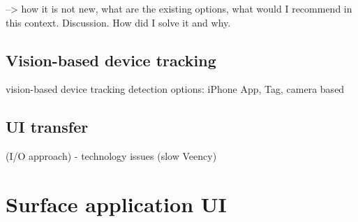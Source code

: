 --> how it is not new, what are the existing options, what would I recommend in this context. Discussion. How did I solve it and why.

\subsection{Vision-based device tracking}
vision-based device tracking
detection options: iPhone App, Tag, camera based 

\subsection{UI transfer}
 (I/O approach)
- technology issues (slow Veency)

\section{Surface application UI}

\subsection{}



